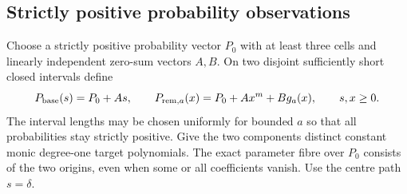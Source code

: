 \documentclass[11pt,reqno]{amsart}
\numberwithin{equation}{section}
\theoremstyle{definition}
\theoremstyle{remark}
\begin{document}
\subsection{Strictly positive probability observations}
Choose a strictly positive probability vector $P_0$ with at least three cells and linearly independent zero-sum vectors $A,B$. On two disjoint sufficiently short closed intervals define
\begin{equation}\label{eq:probability}
 P_{\rm base}(s)=P_0+As,\qquad
 P_{{\rm rem},a}(x)=P_0+A x^m+B g_a(x),\qquad s,x\ge0.
\end{equation}
The interval lengths may be chosen uniformly for bounded $a$ so that all probabilities stay strictly positive. Give the two components distinct constant monic degree-one target polynomials. The exact parameter fibre over $P_0$ consists of the two origins, even when some or all coefficients vanish. Use the centre path $s=\delta$.
\end{document}
